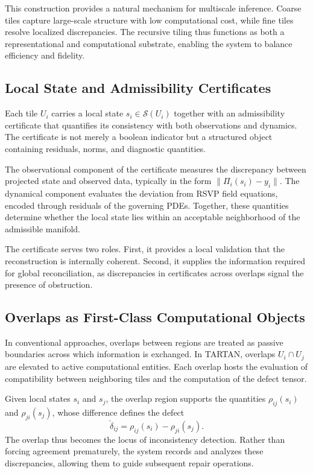 \documentclass[12pt, oneside]{article}
\begin{document}
This construction provides a natural mechanism for multiscale inference. Coarse tiles capture large-scale structure with low computational cost, while fine tiles resolve localized discrepancies. The recursive tiling thus functions as both a representational and computational substrate, enabling the system to balance efficiency and fidelity.

\subsection{Local State and Admissibility Certificates}

Each tile $U_i$ carries a local state $s_i \in \mathcal{S}(U_i)$ together with an admissibility certificate that quantifies its consistency with both observations and dynamics. The certificate is not merely a boolean indicator but a structured object containing residuals, norms, and diagnostic quantities.

The observational component of the certificate measures the discrepancy between projected state and observed data, typically in the form $\|\Pi_i(s_i) - y_i\|$. The dynamical component evaluates the deviation from RSVP field equations, encoded through residuals of the governing PDEs. Together, these quantities determine whether the local state lies within an acceptable neighborhood of the admissible manifold.

The certificate serves two roles. First, it provides a local validation that the reconstruction is internally coherent. Second, it supplies the information required for global reconciliation, as discrepancies in certificates across overlaps signal the presence of obstruction.

\subsection{Overlaps as First-Class Computational Objects}

In conventional approaches, overlaps between regions are treated as passive boundaries across which information is exchanged. In TARTAN, overlaps $U_i \cap U_j$ are elevated to active computational entities. Each overlap hosts the evaluation of compatibility between neighboring tiles and the computation of the defect tensor.

Given local states $s_i$ and $s_j$, the overlap region supports the quantities $\rho_{ij}(s_i)$ and $\rho_{ji}(s_j)$, whose difference defines the defect
\[
\check{\delta}_{ij} = \rho_{ij}(s_i) - \rho_{ji}(s_j).
\]
The overlap thus becomes the locus of inconsistency detection. Rather than forcing agreement prematurely, the system records and analyzes these discrepancies, allowing them to guide subsequent repair operations.
\end{document}
